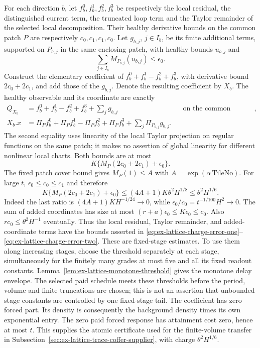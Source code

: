 For each direction $b$, let $f_b^0,f_b^1,f_b^2,f_b^3$ be respectively the
local residual, the distinguished current term, the truncated loop term
and the Taylor remainder of the selected local decomposition. Their
healthy derivative bounds on the common patch $P$ are respectively
$c_0,c_1,c_1,c_0$. Let $g_{b,j}$, $j\in I_b$, be its finite additional
terms, supported on $P_{b,j}$ in the same enclosing patch, with healthy
bounds $u_{b,j}$ and
\begin{equation}
 \sum_{j\in I_b}M_{P_{b,j}}(u_{b,j})\le\epsilon_0.
 \label{eq:trace-charge-tail-price}
\end{equation}
Construct the elementary coefficient of
$f_b^0+f_b^1-f_b^2+f_b^3$, with derivative bound $2c_0+2c_1$, and add
those of the $g_{b,j}$. Denote the resulting coefficient by $X_b$.
The healthy observable and its coordinate are exactly
\begin{align*}
 Q_{X_b}&=f_b^0+f_b^1-f_b^2+f_b^3+\sum_jg_{b,j}
                      &&\text{on the common healthy patch},\\
 X_b.x&=\Pi_P f_b^0+\Pi_P f_b^1-\Pi_P f_b^2+\Pi_P f_b^3
                                      +\sum_j\Pi_{P_{b,j}}g_{b,j}.
\end{align*}
The second equality uses linearity of the local Taylor projection on
regular functions on the same patch; it makes no assertion of global
linearity for different nonlinear local charts.
Both bounds are at most
\[
 K\{M_P(2c_0+2c_1)+\epsilon_0\}.
\]
The fixed patch cover bound gives $M_P(1)\le A$ with
$A=\exp(\alpha\,\mathrm{TileNo})$. For large $t$,
$\epsilon_0\le c_0\le c_1$ and therefore
\[
 K\{M_P(2c_0+2c_1)+\epsilon_0\}
 \le(4A+1)K\theta^2H^{1/8}\le\theta^2H^{1/6}.
\]
Indeed the last ratio is $(4A+1)K H^{-1/24}\to0$, while
$\epsilon_0/c_0=t^{-1/100}H^2\to0$. The sum of added coordinates has
size at most $(r+a)\epsilon_0\le K\epsilon_0\le c_0$.
Also $rc_0\le\theta^2H^{-1}$ eventually. Thus the local residual,
Taylor remainder, and added-coordinate terms have the bounds asserted in
\eqref{eq:ex-lattice-charge-error-one}--
\eqref{eq:ex-lattice-charge-error-two}.
These are fixed-stage estimates. To use them along increasing stages,
choose the threshold separately at each stage, simultaneously for the
finitely many grades at most five and all its fixed readout constants.
Lemma~\ref{lem:ex-lattice-monotone-threshold} gives the monotone delay
envelope. The selected paid schedule meets these thresholds before the
period, volume and finite truncations are chosen; this is not an assertion
that unbounded stage constants are controlled by one fixed-stage tail.
The coefficient has zero forced part. Its density is consequently the
background density times its own exponential entry. The zero paid forced
response has attainment cost zero, hence at most $t$. This supplies the
atomic certificate used for the finite-volume transfer in Subsection~\ref{sec:ex-lattice-trace-coffer-supplier}, with charge
$\theta^2H^{1/6}$.

